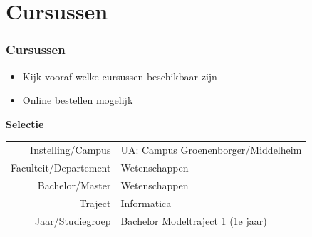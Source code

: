 \section{Cursussen}
\begin{frame}[allowframebreaks=10]
	\frametitle{Cursussen}
	
	\begin{itemize}
		\item Kijk vooraf welke cursussen beschikbaar zijn
		\item Online bestellen mogelijk
	\end{itemize}
	
	\framebreak

	\centering
    \vspace*{0.02cm}
    \textbf{Selectie} \\
    \vspace{0.6cm}	
	
	\begin{tabularx}{\linewidth}{rX}
	  Instelling/Campus & UA: Campus Groenenborger/Middelheim\\
	  Faculteit/Departement & Wetenschappen\\
	  Bachelor/Master & Wetenschappen\\
	  Traject & Informatica\\
	  Jaar/Studiegroep & Bachelor Modeltraject 1 (1e jaar)\\
	\end{tabularx} \vspace{0.5cm}
	
\end{frame}

%    
%    
%

